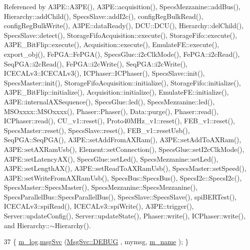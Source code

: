 Referenced by A3\+P\+E\+::\+A3\+P\+E(), A3\+P\+E\+::acquisition(), Specs\+Mezzanine\+::add\+Bus(), Hierarchy\+::add\+Child(), Specs\+Slave\+::add\+I2c(), config\+Reg\+Bulk\+Read(), config\+Reg\+Bulk\+Write(), A3\+P\+E\+::data\+Ready(), D\+C\+U\+::\+D\+C\+U(), Hierarchy\+::del\+Child(), Specs\+Slave\+::detect(), Storage\+Fifo\+Acquisition\+::execute(), Storage\+Fifo\+::execute(), A3\+P\+E\+\_\+\+Bit\+Flip\+::execute(), Acquisition\+::execute(), Emulate\+F\+E\+::execute(), export\+\_\+obj(), Fe\+P\+G\+A\+::\+Fe\+P\+G\+A(), Specs\+Glue\+::i2c\+Clk\+Mode(), Fe\+P\+G\+A\+::i2c\+Read(), Seq\+P\+G\+A\+::i2c\+Read(), Fe\+P\+G\+A\+::i2c\+Write(), Seq\+P\+G\+A\+::i2c\+Write(), I\+C\+E\+C\+A\+Lv3\+::\+I\+C\+E\+C\+A\+Lv3(), I\+C\+Phaser\+::\+I\+C\+Phaser(), Specs\+Slave\+::init(), Specs\+Master\+::init(), Storage\+Fifo\+Acquisition\+::initialize(), Storage\+Fifo\+::initialize(), A3\+P\+E\+\_\+\+Bit\+Flip\+::initialize(), Acquisition\+::initialize(), Emulate\+F\+E\+::initialize(), A3\+P\+E\+::internal\+A\+X\+Sequence(), Specs\+Glue\+::led(), Specs\+Mezzanine\+::led(), M\+S\+Oxxxx\+::\+M\+S\+Oxxxx(), Phaser\+::\+Phaser(), Data\+::purge(), Phaser\+::read(), I\+C\+Phaser\+::read(), C\+U\+\_\+v1\+::reset(), Proto40\+M\+Hz\+\_\+v1\+::reset(), F\+E\+B\+\_\+v1\+::reset(), Specs\+Master\+::reset(), Specs\+Slave\+::reset(), F\+E\+B\+\_\+v1\+::reset\+Usb(), Seq\+P\+G\+A\+::\+Seq\+P\+G\+A(), A3\+P\+E\+::set\+Add\+From\+A\+X\+Ram(), A3\+P\+E\+::set\+Add\+To\+A\+X\+Ram(), A3\+P\+E\+::set\+A\+X\+Ram\+Usb(), Element\+::set\+Connection(), Specs\+Glue\+::set\+I2c\+Clk\+Mode(), A3\+P\+E\+::set\+Latency\+A\+X(), Specs\+Glue\+::set\+Led(), Specs\+Mezzanine\+::set\+Led(), A3\+P\+E\+::set\+Length\+A\+X(), A3\+P\+E\+::set\+Read\+To\+A\+X\+Ram\+Usb(), Specs\+Master\+::set\+Speed(), A3\+P\+E\+::set\+Write\+From\+A\+X\+Ram\+Usb(), Specs\+Bus\+::\+Specs\+Bus(), Specs\+I2c\+::\+Specs\+I2c(), Specs\+Master\+::\+Specs\+Master(), Specs\+Mezzanine\+::\+Specs\+Mezzanine(), Specs\+Parallel\+Bus\+::\+Specs\+Parallel\+Bus(), Specs\+Slave\+::\+Specs\+Slave(), spi\+B\+E\+R\+Test(), I\+C\+E\+C\+A\+Lv3\+::spi\+Read(), I\+C\+E\+C\+A\+Lv3\+::spi\+Write(), A3\+P\+E\+::trigger(), Server\+::update\+Config(), Server\+::update\+State(), Phaser\+::write(), I\+C\+Phaser\+::write(), and Hierarchy\+::$\sim$\+Hierarchy().


\begin{DoxyCode}
37 \{ \hyperlink{classObject_a0d269813dd7ac1f24bc143031e2963f2}{m\_log}.\hyperlink{classMsgSvc_ad25f18047920cc59a314e5098259711c}{msgSvc} (\hyperlink{classMsgSvc_ae671eb7301996cd049d2da8a65925926a1dbdcc82dce88370ec335883c83b38b0}{MsgSvc::DEBUG}   , mymsg, \hyperlink{classObject_a8b83c95c705d2c3ba0d081fe1710f48d}{m\_name} ); \}
\end{DoxyCode}
\mbox{\label{classObject_a6c9a0397ca804e04d675ed05683f5420}} 
